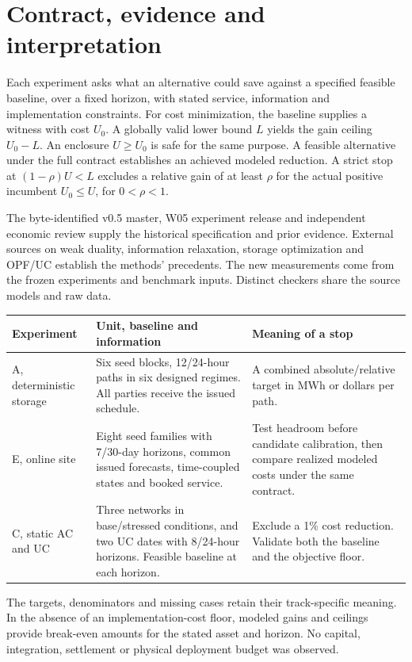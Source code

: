 \documentclass[10pt,letterpaper]{article}
\begin{document}
\section{Contract, evidence and interpretation}
Each experiment asks what an alternative could save against a specified feasible baseline, over a fixed horizon, with stated service, information and implementation constraints. For cost minimization, the baseline supplies a witness with cost $U_0$. A globally valid lower bound $L$ yields the gain ceiling $U_0-L$. An enclosure $U\ge U_0$ is safe for the same purpose. A feasible alternative under the full contract establishes an achieved modeled reduction. A strict stop at $(1-\rho)U<L$ excludes a relative gain of at least $\rho$ for the actual positive incumbent $U_0\le U$, for $0<\rho<1$.

The byte-identified v0.5 master, W05 experiment release and independent economic review supply the historical specification and prior evidence. External sources on weak duality, information relaxation, storage optimization and OPF/UC establish the methods' precedents. The new measurements come from the frozen experiments and benchmark inputs. Distinct checkers share the source models and raw data.

\begin{tabularx}{\linewidth}{@{}p{.19\linewidth}Xp{.30\linewidth}@{}}
\toprule
Experiment & Unit, baseline and information & Meaning of a stop\\\midrule
A, deterministic storage & Six seed blocks, 12/24-hour paths in six designed regimes. All parties receive the issued schedule. & A combined absolute/relative target in MWh or dollars per path.\\
E, online site & Eight seed families with 7/30-day horizons, common issued forecasts, time-coupled states and booked service. & Test headroom before candidate calibration, then compare realized modeled costs under the same contract.\\
C, static AC and UC & Three networks in base/stressed conditions, and two UC dates with 8/24-hour horizons. Feasible baseline at each horizon. & Exclude a 1\% cost reduction. Validate both the baseline and the objective floor.\\\bottomrule
\end{tabularx}

The targets, denominators and missing cases retain their track-specific meaning. In the absence of an implementation-cost floor, modeled gains and ceilings provide break-even amounts for the stated asset and horizon. No capital, integration, settlement or physical deployment budget was observed.
\end{document}
